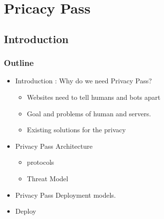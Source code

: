 \chapter{Pricacy Pass}

\section{Introduction}
\subsection{Outline}

\begin{itemize}
    \item Introduction : Why do we need Privacy Pass?
    \begin{itemize}
        \item Websites need to tell humans and bots apart
        \item Goal and problems of human and servers.
        \item Existing solutions for the privacy
    \end{itemize}
    \item  Privacy Pass Architecture
    \begin{itemize}
        \item protocols
        \item Threat Model
    \end{itemize}
    \item  Privacy Pass Deployment models.
    \item Deploy
\end{itemize}


